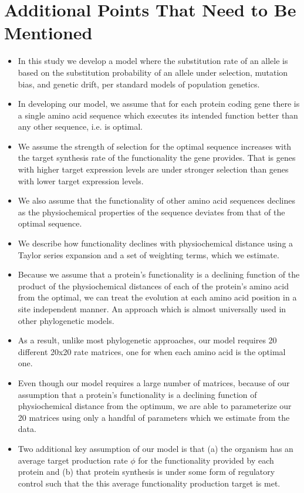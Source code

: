 \documentclass{article}
\begin{document}
\section*{Additional Points That Need to Be Mentioned}
\begin{itemize}
\item In this study we develop a model where the substitution rate of an allele is based on the substitution probability of an allele under selection, mutation bias, and genetic drift, per standard models of population genetics.
\item In developing our model, we assume that for each protein coding gene there is a single amino acid sequence which executes its intended function better than any other sequence, i.e. is optimal.
\item We assume the strength of selection for the optimal sequence increases with the target synthesis rate of the functionality the gene provides.
That is genes with higher target expression levels are under stronger selection than genes with lower target expression levels.
\item We also assume that the functionality of other amino acid sequences declines as the physiochemical properties of the sequence deviates from that of the optimal sequence.
\item We describe how functionality  declines with physiochemical distance using a Taylor series expansion and a set of weighting terms, which we estimate.
\item Because we assume that a protein's functionality is a declining function of the product of the physiochemical distances of each of the protein's amino acid from the optimal, we can treat the evolution at each amino acid position in a site independent manner. 
An approach which is almost universally used in other phylogenetic models.
\item As a result, unlike most phylogenetic approaches, our model requires 20 different 20x20 rate matrices, one for when each amino acid is the optimal one.
\item Even though our model requires a large number of matrices, because of our assumption that a protein's functionality is a declining function of physiochemical distance from the optimum, we are able to parameterize our 20 matrices using only a handful of parameters which we estimate from the data.
\item Two additional key assumption of our model is that (a) the organism has an average target production rate $\phi$ for the functionality provided by each protein and (b) that protein synthesis is under some form of  regulatory control such that the this average functionality production target is met.

\end{itemize}
\end{document}
